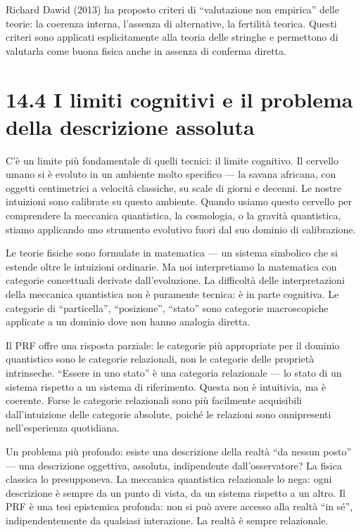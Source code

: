 \documentclass[11.5pt,a4paper,openany]{book}
\theoremstyle{remark}
\begin{document}
Richard Dawid (2013) ha proposto criteri di ``valutazione non empirica'' delle teorie: la coerenza interna, l'assenza di alternative, la fertilità teorica. Questi criteri sono applicati esplicitamente alla teoria delle stringhe e permettono di valutarla come buona fisica anche in assenza di conferma diretta.

\section{14.4 I limiti cognitivi e il problema della descrizione assoluta}

C'è un limite più fondamentale di quelli tecnici: il limite cognitivo. Il cervello umano si è evoluto in un ambiente molto specifico --- la savana africana, con oggetti centimetrici a velocità classiche, su scale di giorni e decenni. Le nostre intuizioni sono calibrate su questo ambiente. Quando usiamo questo cervello per comprendere la meccanica quantistica, la cosmologia, o la gravità quantistica, stiamo applicando uno strumento evolutivo fuori dal suo dominio di calibrazione.

Le teorie fisiche sono formulate in matematica --- un sistema simbolico che si estende oltre le intuizioni ordinarie. Ma noi interpretiamo la matematica con categorie concettuali derivate dall'evoluzione. La difficoltà delle interpretazioni della meccanica quantistica non è puramente tecnica: è in parte cognitiva. Le categorie di ``particella'', ``posizione'', ``stato'' sono categorie macroscopiche applicate a un dominio dove non hanno analogia diretta.

Il PRF offre una risposta parziale: le categorie più appropriate per il dominio quantistico sono le categorie relazionali, non le categorie delle proprietà intrinseche. ``Essere in uno stato'' è una categoria relazionale --- lo stato di un sistema rispetto a un sistema di riferimento. Questa non è intuitivia, ma è coerente. Forse le categorie relazionali sono più facilmente acquisibili dall'intuizione delle categorie absolute, poiché le relazioni sono onnipresenti nell'esperienza quotidiana.

Un problema più profondo: esiste una descrizione della realtà ``da nessun posto'' --- una descrizione oggettiva, assoluta, indipendente dall'osservatore? La fisica classica lo presupponeva. La meccanica quantistica relazionale lo nega: ogni descrizione è sempre da un punto di vista, da un sistema rispetto a un altro. Il PRF è una tesi epistemica profonda: non si può avere accesso alla realtà ``in sé'', indipendentemente da qualsiasi interazione. La realtà è sempre relazionale.
\end{document}
